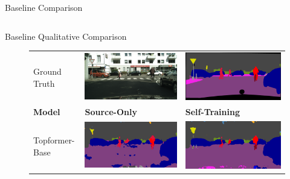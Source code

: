 \documentclass{lib/curtin_format}
\begin{document}
\begin{frame}{Baseline Comparison}
\begin{table}[]
{\begin{tabular}{|l|l|r|l|r|r|r|}
            \end{tabular}
        }
    \end{table}
\end{frame}

\begin{frame}{Baseline Qualitative Comparison}
    \begin{figure}[]
        \centering
        \begin{tabular}{lll}
            Ground Truth   & \includegraphics[width=.3\linewidth]{res/lightweight-uda-baseline-qualitative/image.png}                     & \includegraphics[width=.3\linewidth]{res/lightweight-uda-baseline-qualitative/ground-truth.png}                \\
            \textbf{Model} & \textbf{Source-Only}                                                                                         & \textbf{Self-Training}                                                                                         \\
            Topformer-Base & \includegraphics[width=.3\linewidth]{res/lightweight-uda-baseline-qualitative/topformer-base-sourceonly.png} & \includegraphics[width=.3\linewidth]{res/lightweight-uda-baseline-qualitative/topformer-base-selftraining.png} \\

\end{tabular}
\end{figure}
\end{frame}
\end{document}
